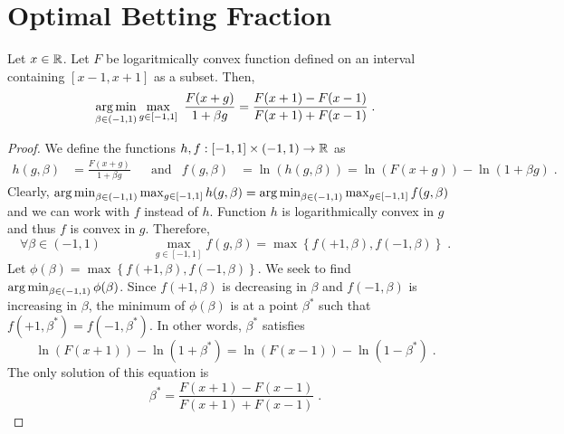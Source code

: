 \section{Optimal Betting Fraction}
\label{section:optimal-betting-fraction}

\begin{theorem}
\label{theorem:optimal-betting-fraction}
Let $x \in \mathbb{R}$. Let $F$ be logaritmically convex function defined on an interval
containing $[x-1,x+1]$ as a subset. Then,
$$
\operatorname*{arg\,min}_{\beta \in (-1,1)} \max_{g \in [-1,1]} \ \frac{F(x+g)}{1 + \beta g}
= \frac{F(x+1) - F(x-1)}{F(x+1) + F(x-1)} \; .
$$
\end{theorem}

\begin{proof}
We define the functions $h,f:[-1,1] \times (-1,1) \to \mathbb{R}$ as
\begin{align*}
h(g, \beta) & = \frac{F(x+g)}{1 + \beta g} &
& \text{and} &
f(g, \beta) & = \ln (h(g,\beta)) = \ln(F(x+g)) - \ln(1 + \beta g) \; .
\end{align*}
Clearly, $\operatorname*{arg\,min}_{\beta \in (-1,1)} \max_{g \in [-1,1]} h(g,\beta) = \operatorname*{arg\,min}_{\beta \in (-1,1)} \max_{g \in [-1,1]} f(g,\beta)$
and we can work with $f$ instead of $h$. Function $h$ is logarithmically convex
in $g$ and thus $f$ is convex in $g$. Therefore,
$$
\forall \beta \in (-1,1) \qquad \qquad
\max_{g \in [-1,1]} f(g,\beta) = \max \left\{ f(+1,\beta), f(-1,\beta) \right\} \; .
$$
Let $\phi(\beta) = \max \left\{ f(+1,\beta), f(-1,\beta) \right\}$. We seek to
find $\operatorname*{arg\,min}_{\beta \in (-1,1)} \phi(\beta)$. Since $f(+1,\beta)$ is decreasing
in $\beta$ and $f(-1,\beta)$ is increasing in $\beta$, the minimum of
$\phi(\beta)$ is at a point $\beta^*$ such that $f(+1,\beta^*) = f(-1,\beta^*)$.
In other words, $\beta^*$ satisfies
$$
\ln(F(x+1)) - \ln(1 + \beta^*) =  \ln(F(x-1)) - \ln(1 - \beta^*) \; .
$$
The only solution of this equation is
$$
\beta^* = \frac{F(x+1) - F(x-1)}{F(x+1) + F(x-1)} \; .
$$
\end{proof}
